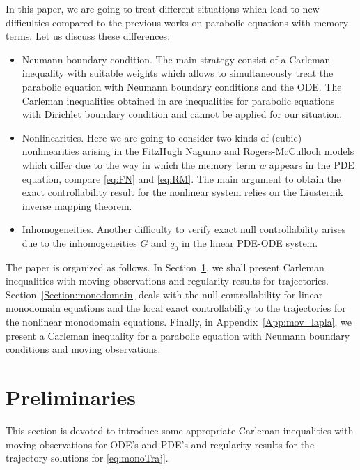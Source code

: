 \documentclass[10pt]{article}
\begin{document}
	In this paper, we are going to treat different situations which lead to new difficulties compared to the previous
	works on parabolic equations with memory terms. Let us discuss these differences:
\begin{itemize}
	\item Neumann boundary condition. The main strategy consist of a Carleman inequality with suitable weights which allows to
	simultaneously treat the parabolic equation with Neumann boundary conditions and the ODE.
	The Carleman inequalities obtained in \cite{zuazua_memory} are inequalities
	for parabolic equations with Dirichlet boundary condition and cannot be applied for our situation.
	\item Nonlinearities. Here we are going to consider two kinds of (cubic) nonlinearities arising in the FitzHugh Nagumo and Rogers-McCulloch
	models which differ due to the way in which the memory term $w$ appears in the PDE equation, compare \eqref{eq:FN}
	and \eqref{eq:RM}.
	The main argument to obtain the exact controllability result for the nonlinear system relies
	on the Liusternik inverse mapping theorem.
	\item  Inhomogeneities.
	Another difficulty to verify exact null controllability arises due to the inhomogeneities  $G$ and $q_0$
	in the linear PDE-ODE system.
\end{itemize}

The paper is organized as follows.
	In Section~\ref{preliminaries_section}, we shall present Carleman inequalities with moving observations
	and regularity results for trajectories.
	Section~\ref{Section:monodomain} deals with the null controllability for linear monodomain equations and
	the local exact controllability to the trajectories for the nonlinear monodomain equations.
	Finally, in Appendix~\ref{App:mov_lapla}, we present a Carleman inequality for a parabolic
	equation with Neumann boundary conditions and moving observations.


\section{Preliminaries}\label{preliminaries_section}

    This section is devoted to introduce some appropriate Carleman inequalities with moving observations for ODE's and PDE's and
    regularity results for the trajectory solutions for \eqref{eq:monoTraj}.
\end{document}
